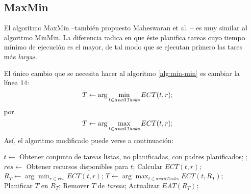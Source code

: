 \subsection{MaxMin}
\label{alg:max-min}
El algoritmo MaxMin --también propuesto Maheswaran et al. \cite{maheswaran1999dynamic}-- es muy similar al algoritmo MinMin. La diferencia radica en que éste planifica tareas cuyo tiempo mínimo de ejecución es el mayor, de tal modo que se ejecutan primero las tares más \emph{largas}.

El único cambio que se necesita hacer al algoritmo \ref{alg:min-min} es cambiar la línea 14:
\[T \leftarrow \arg\min_{t \in \emph{availTasks}}ECT(t,r);\]
por
\[T \leftarrow \arg\max_{t \in \emph{availTasks}}ECT(t,r);\]
Así, el algoritmo modificado puede verse a continuación: %
\\
\begin{algorithmic}[1]
	\State $t \gets$ Obtener conjunto de tareas listas, no planificadas, con padres planificados;
	\State {};
\EndWhile
{}
			\State $res \gets$ Obtener recursos disponibles para $t$;
				\State Calcular $ECT(t,r)$;
			\EndFor
			\State $R_T \gets \arg\min_{r \in res}ECT(t,r)$;
		\EndFor
		\State $T \gets \arg\max_{t \in availTasks}ECT(t,R_T)$;
		\State Planificar $T$ en $R_T$;
		\State Remover $T$ de \emph{tareas};
		\State Actualizar $EAT(R_T)$;
	\EndWhile
\EndProcedure
\end{algorithmic}

